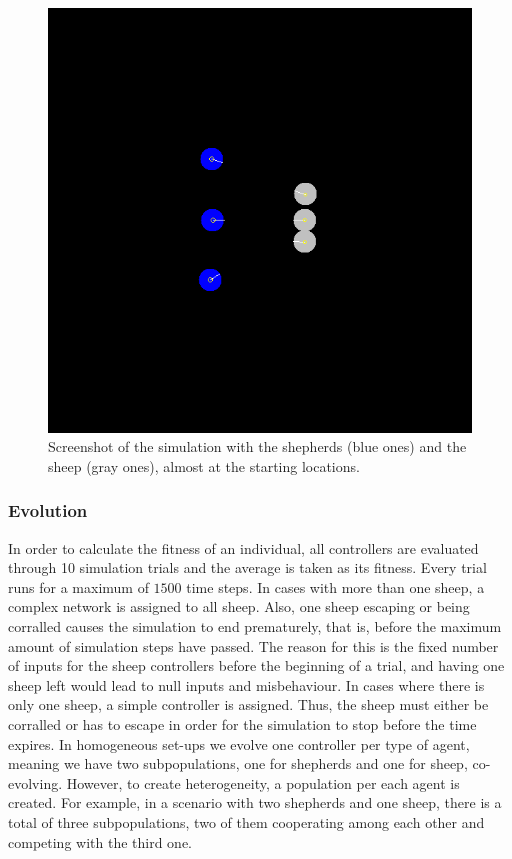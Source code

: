 \documentclass[conference]{IEEEtran}
\begin{document}
\begin{figure}[t]
	\centering
	\includegraphics[width=0.8\hsize]{imgs/pasture.png}
	\caption{Screenshot of the simulation with the shepherds (blue ones) and the sheep (gray ones), almost at the starting locations.}
	\label{fig:simulation_screenshot}
\end{figure}


\subsubsection{Evolution}
In order to calculate the fitness of an individual, all controllers are evaluated through 10 simulation trials and the average is taken as its fitness.
Every trial runs for a maximum of $1500$ time steps. 
In cases with more than one sheep, a complex network is assigned to all sheep. 
Also, one sheep escaping or being corralled causes the simulation to end prematurely, that is, before the maximum amount of simulation steps have passed.
The reason for this is the fixed number of inputs for the sheep controllers before the beginning of a trial, and having one sheep left would lead to null inputs and misbehaviour.
In cases where there is only one sheep, a simple controller is assigned. 
Thus, the sheep must either be corralled or has to escape in order for the simulation to stop before the time expires.
In homogeneous set-ups we evolve one controller per type of agent, meaning we have two subpopulations, one for shepherds and one for sheep, co-evolving. 
However, to create heterogeneity, a population per each agent is created. 
For example, in a scenario with two shepherds and one sheep, there is a total of three subpopulations, two of them cooperating among each other and competing with the third one.  
\end{document}
